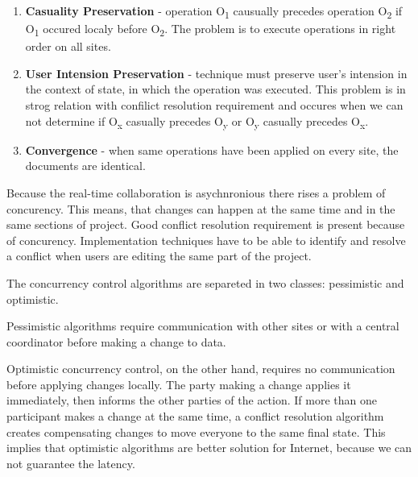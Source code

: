 \documentclass[12pt,oneside]{fithesis2}
\begin{document}
\begin{enumerate}
\item \textbf{Casuality Preservation} - operation O\textsubscript{1} causually precedes operation O\textsubscript{2} if O\textsubscript{1} occured localy before O\textsubscript{2}. The problem is to execute operations in right order on all sites.
\item \textbf{User Intension Preservation} - technique must preserve user's intension in the context of state, in which the operation was executed. This problem is in strog relation with confilict resolution requirement and occures when we can not determine if O\textsubscript{x} casually precedes O\textsubscript{y} or O\textsubscript{y} casually precedes O\textsubscript{x}.
\item \textbf{Convergence} - when same operations have been applied on every site, the documents are identical.
\end{enumerate}
\par Because the real-time collaboration is asychnronious there rises a problem of concurency. This means, that changes can happen at the same time and in the same sections of project. Good conflict resolution requirement is present because of concurency. Implementation techniques have to be able to identify and resolve a conflict when users are editing the same part of the project. \par The concurrency control algorithms are separeted in two classes: pessimistic and optimistic. \par Pessimistic algorithms require communication with other sites or with a central coordinator before making a change to data. \par Optimistic concurrency control, on the other hand, requires no communication before applying changes locally. The party making a change applies it immediately, then informs the other parties of the action. If more than one participant makes a change at the same time, a conflict resolution algorithm creates compensating changes to move everyone to the same final state.\cite{Jupiter} This implies that optimistic algorithms are better solution for Internet, because we can not guarantee the latency.
\end{document}

